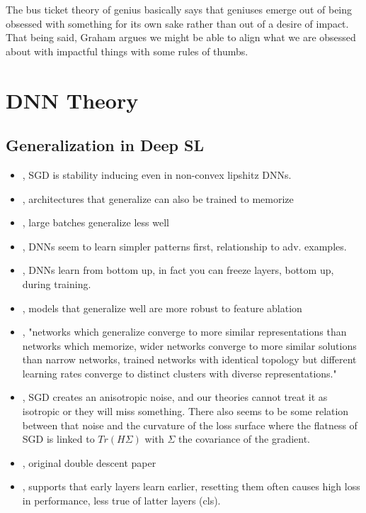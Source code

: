 The bus ticket theory of genius \cite{graham2019busticket} basically says that geniuses emerge out of being obsessed with something for its own sake rather than out of a desire of impact. That being said, Graham argues we might be able to align what we are obsessed about with impactful things with some rules of thumbs.

\section{DNN Theory}



\subsection{Generalization in Deep SL}
\begin{itemize}
    \item \citet{hardt2016train}, SGD is stability inducing even in non-convex lipshitz DNNs.
    \item \citet{zhang2016understanding}, architectures that generalize can also be trained to memorize
    \item \citet{keskar2016large}, large batches generalize less well
    \item \citet{arpit2017closer}, DNNs seem to learn simpler patterns first, relationship to adv. examples.
    \item \citet{raghu2017svcca}, DNNs learn from bottom up, in fact you can freeze layers, bottom up, during training.
    \item \citet{morcos2018importance}, models that generalize well are more robust to feature ablation
    \item \citet{morcos2018insights}, "networks which generalize converge to more similar representations than networks which memorize, wider networks converge to more similar solutions than narrow networks, trained networks with identical topology but different learning rates converge to distinct clusters with diverse representations."
    \item \citet{zhu2018anisotropic}, SGD creates an anisotropic noise, and our theories cannot treat it as isotropic or they will miss something. There also seems to be some relation between that noise and the curvature of the loss surface where the flatness of SGD is linked to $Tr(H \Sigma)$ with $\Sigma$ the covariance of the gradient.
    \item \citet{belkin2018reconciling}, original double descent paper
    \item \citet{zhang2019layers}, supports that early layers learn earlier, resetting them often causes high loss in performance, less true of latter layers (cls).

\end{itemize}
